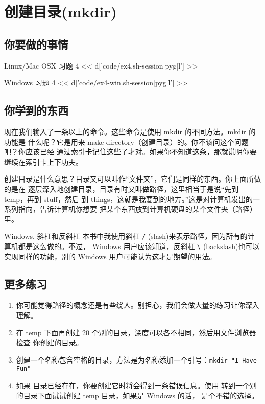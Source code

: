 \chapter{创建目录(mkdir)}

\section{你要做的事情}

\begin{code}{Linux/Mac OSX 习题 4}
<< d['code/ex4.sh-session|pyg|l'] >>
\end{code}

\begin{code}{Windows 习题 4}
<< d['code/ex4-win.sh-session|pyg|l'] >>
\end{code}

\section{你学到的东西}

现在我们输入了一条以上的命令。这些命令是使用 mkdir 的不同方法。mkdir 的功能是
什么呢？它是用来 make directory（创建目录）的。你不该问这个问题吧？你应该已经
通过索引卡记住这些了才对。如果你不知道这条，那就说明你要继续在索引卡上下功夫。

创建目录是什么意思？目录又可以叫作“文件夹”，它们是同样的东西。你上面所做的是在
逐层深入地创建目录，目录有时又叫做路径，这里相当于是说“先到 temp，再到 stuff，然后
到 things，这就是我要到的地方。”这是对计算机发出的一系列指向，告诉计算机你想要
把某个东西放到计算机硬盘的某个文件夹（路径）里。


\begin{aside}{Windows, 斜杠和反斜杠}
本书中我使用斜杠 \verb|/| (slash)来表示路径，因为所有的计算机都是这么做的。不过，
Windows 用户应该知道，反斜杠 \verb|\| (backslash)也可以实现同样的功能，别的
Windows 用户可能认为这才是期望的用法。
\end{aside}

\section{更多练习}

\begin{enumerate}
\item 你可能觉得路径的概念还是有些绕人。别担心，我们会做大量的练习让你深入理解。
\item 在 temp 下面再创建 20 个别的目录，深度可以各不相同，然后用文件浏览器检查
你创建的目录。
\item 创建一个名称包含空格的目录，方法是为名称添加一个引号：\verb|mkdir "I Have Fun"|
\item 如果  目录已经存在，你要创建它时将会得到一条错误信息。使用 
 转到一个别的目录下面试试创建 temp 目录，如果是 Windows 的话，
是个不错的选择。
\end{enumerate}

